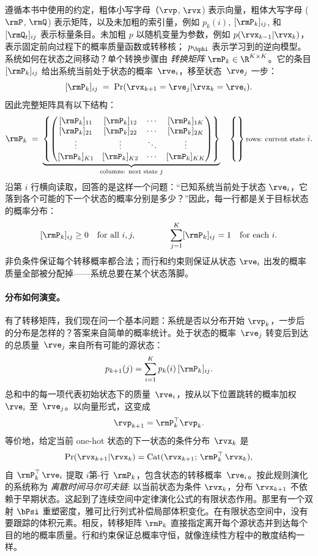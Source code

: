 遵循本书中使用的约定，粗体小写字母（$\rvp$, $\rvx$) 表示向量，粗体大写字母 ($\rmP$, $\rmQ$) 表示矩阵，以及未加粗的索引量，例如 $p_k(i)$,
$[\rmP_k]_{ij}$, 和 $[\rmQ_t]_{ij}$ 表示标量条目。未加粗
$p$ 以随机变量为参数，例如
$p(\rvx_{k-1}|\rvx_k)$，表示固定前向过程下的概率质量函数或转移核； $p_{\bphi}$ 表示学习到的逆向模型。系统如何在状态之间移动？单个转换步骤由 \emph{转换矩阵} $\rmP_k \in \R^{K \times K}$。它的条目 $[\rmP_k]_{ij}$ 给出系统当前处于状态的概率~$\rve_i$，移至状态~$\rve_j$ 一步：
\[
[\rmP_k]_{ij} \;=\; \Pr(\rvx_{k+1} = \rve_j | \rvx_k = \rve_i).
\]
因此完整矩阵具有以下结构：
\[
\rmP_k \;=\;
\underbrace{
\left\{
\begin{pmatrix}
[\rmP_k]_{11} & [\rmP_k]_{12} & \cdots & [\rmP_k]_{1K} \\
[\rmP_k]_{21} & [\rmP_k]_{22} & \cdots & [\rmP_k]_{2K} \\
\vdots & \vdots & \ddots & \vdots \\
[\rmP_k]_{K1} & [\rmP_k]_{K2} & \cdots & [\rmP_k]_{KK}
\end{pmatrix}
\right\}
}_{\substack{\text{columns: next state } j}}
\quad
\left\{
\vphantom{
\begin{pmatrix}
a \\ a \\ \vdots \\ a
\end{pmatrix}
}
\right\}
\text{\footnotesize rows: current state } i.
\]
沿第 $i$ 行横向读取，回答的是这样一个问题：``已知系统当前处于状态 $\rve_i$，它落到各个可能的下一个状态的概率分别是多少？''因此，每一行都是关于目标状态的概率分布：
\[
[\rmP_k]_{ij} \geq 0
\quad \text{for all } i,j,
\qquad\qquad
\sum_{j=1}^{K} [\rmP_k]_{ij} = 1
\quad \text{for each } i.
\]
非负条件保证每个转移概率都合法；而行和约束则保证从状态 $\rve_i$ 出发的概率质量全部被分配掉——系统总要在某个状态落脚。

\paragraph{分布如何演变。}
有了转移矩阵，我们现在问一个基本问题：系统是否以分布开始 $\rvp_k$，一步后的分布是怎样的？答案来自简单的概率统计。处于状态的概率~$\rve_j$ 转变后到达的总质量~$\rve_j$ 来自所有可能的源状态：
\begin{equation}
p_{k+1}(j) = \sum_{i=1}^K p_k(i)\,[\rmP_k]_{ij}.
\label{eq:discrete-transport-one-step}
\end{equation}
总和中的每一项代表初始状态下的质量~$\rve_i$，按从以下位置跳转的概率加权~$\rve_i$ 至~$\rve_j$。以向量形式，这变成
\[
\rvp_{k+1} = \rmP_k^\top \rvp_k.
\]
等价地，给定当前 one-hot 状态的下一状态的条件分布~$\rvx_k$ 是
\[
\Pr(\rvx_{k+1} | \rvx_k)
= \mathrm{Cat}(\rvx_{k+1};\,\rmP_k^\top\,\rvx_k),
\]
自 $\rmP_k^\top\,\rve_i$ 提取 $i$第-行~$\rmP_k$，包含状态的转移概率~$\rve_i$。按此规则演化的系统称为 \emph{离散时间马尔可夫链}: 以当前状态为条件 $\rvx_k$，分布
$\rvx_{k+1}$ 不依赖于早期状态。这起到了连续空间中定律演化公式的有限状态作用。那里有一个双射 $\bPsi$ 重塑密度，雅可比行列式补偿局部体积变化。在有限状态空间中，没有要跟踪的体积元素。相反，转移矩阵 $\rmP_k$ 直接指定离开每个源状态并到达每个目的地的概率质量。行和约束保证总概率守恒，就像连续性方程中的散度结构一样。

